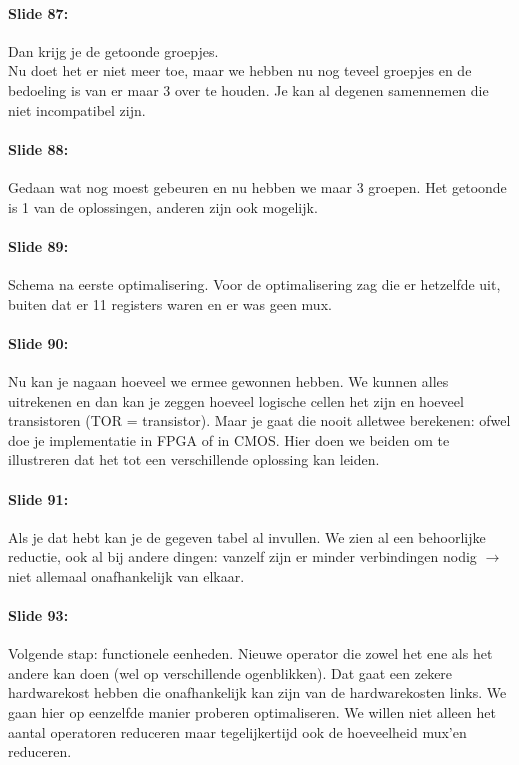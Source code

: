 \documentclass[10pt,a4paper]{book}
\begin{document}
\paragraph{Slide 87:} Dan krijg je de getoonde groepjes.\\
Nu doet het er niet meer toe, maar we hebben nu nog teveel groepjes en de bedoeling is van er maar 3 over te houden. Je kan al degenen samennemen die niet incompatibel zijn.

\paragraph{Slide 88:} Gedaan wat nog moest gebeuren en nu hebben we maar 3 groepen. Het getoonde is 1 van de oplossingen, anderen zijn ook mogelijk.

\paragraph{Slide 89:} Schema na eerste optimalisering. Voor de optimalisering zag die er hetzelfde uit, buiten dat er 11 registers waren en er was geen mux. 

\paragraph{Slide 90:} Nu kan je nagaan hoeveel we ermee gewonnen hebben. We kunnen alles uitrekenen en dan kan je zeggen hoeveel logische cellen het zijn en hoeveel transistoren (TOR = transistor). Maar je gaat die nooit alletwee berekenen: ofwel doe je implementatie in FPGA of in CMOS. Hier doen we beiden om te illustreren dat het tot een verschillende oplossing kan leiden. 

\paragraph{Slide 91:} Als je dat hebt kan je de gegeven tabel al invullen. We zien al een behoorlijke reductie, ook al bij andere dingen: vanzelf zijn er minder verbindingen nodig $\rightarrow$ niet allemaal onafhankelijk van elkaar. 

\paragraph{Slide 93:} Volgende stap: functionele eenheden. Nieuwe operator die zowel het ene als het andere kan doen (wel op verschillende ogenblikken). Dat gaat een zekere hardwarekost hebben die onafhankelijk kan zijn van de hardwarekosten links. We gaan hier op eenzelfde manier proberen optimaliseren. We willen niet alleen het aantal operatoren reduceren maar tegelijkertijd ook de hoeveelheid mux'en reduceren.
\end{document}
